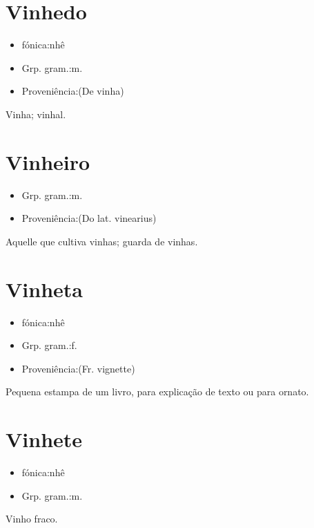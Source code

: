 \documentclass{article}
\begin{document}
\section{Vinhedo}
\begin{itemize}
\item {fónica:nhê}
\end{itemize}
\begin{itemize}
\item {Grp. gram.:m.}
\end{itemize}
\begin{itemize}
\item {Proveniência:(De \textunderscore vinha\textunderscore )}
\end{itemize}
Vinha; vinhal.
\section{Vinheiro}
\begin{itemize}
\item {Grp. gram.:m.}
\end{itemize}
\begin{itemize}
\item {Proveniência:(Do lat. \textunderscore vinearius\textunderscore )}
\end{itemize}
Aquelle que cultiva vinhas; guarda de vinhas.
\section{Vinheta}
\begin{itemize}
\item {fónica:nhê}
\end{itemize}
\begin{itemize}
\item {Grp. gram.:f.}
\end{itemize}
\begin{itemize}
\item {Proveniência:(Fr. \textunderscore vignette\textunderscore )}
\end{itemize}
Pequena estampa de um livro, para explicação de texto ou para ornato.
\section{Vinhete}
\begin{itemize}
\item {fónica:nhê}
\end{itemize}
\begin{itemize}
\item {Grp. gram.:m.}
\end{itemize}
Vinho fraco.
\end{document}
